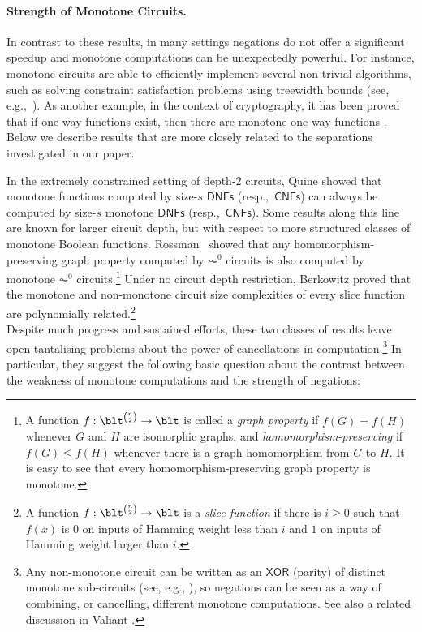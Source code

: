 \documentclass[11pt]{article}
\newcommand{\headsubsec}[1]{\paragraph{#1.}}
\begin{document}
\headsubsec{Strength of Monotone Circuits} 

In contrast to these results, in many settings negations do not offer a significant speedup and monotone computations can be unexpectedly powerful. For instance, monotone circuits are able to efficiently implement several non-trivial algorithms, such as solving constraint satisfaction problems using treewidth bounds (see, e.g.,~\citep[Chapter 3]{Oliveira15}). As another example, in the context of cryptography, it has been proved that if one-way functions exist, then there are monotone one-way functions \citep{DBLP:journals/toc/GoldreichI12}. Below we describe results that are more closely related to the separations investigated in our paper.

 In the extremely constrained setting of depth-$2$ circuits, Quine \cite{quine_1953} showed that monotone functions computed by size-$s$ $\mathsf{DNFs}$ (resp.,~$\mathsf{CNFs}$) can always be computed by size-$s$ monotone $\mathsf{DNFs}$ (resp.,~$\mathsf{CNFs}$). Some results along this line are  known for larger circuit depth, but with respect to more structured classes of monotone Boolean functions. Rossman~\cite{rossman_2008, rossman_16} showed that any homomorphism-preserving graph property computed by \(\AC^0\) circuits is also computed
by monotone \(\AC^0\) circuits.\footnote{A function $f : \blt^{\binom{n}{2}} \to \blt$
is called a \emph{graph property}
if
$f(G) = f(H)$ whenever $G$ and $H$ are isomorphic graphs,
and \emph{homomorphism-preserving}
if
$f(G) \leq f(H)$ whenever there is a 
graph homomorphism from $G$ to $H$. It is easy to see that every homomorphism-preserving graph property is monotone.} Under no circuit depth restriction, 
Berkowitz \citep{berkowitz} proved that the monotone and non-monotone circuit size complexities of every slice function are polynomially related.\footnote{A function $f : \blt^{\binom{n}{2}} \to \blt$
is a \emph{slice function} if there is $i \geq 0$ such that $f(x)$ is $0$ on inputs of Hamming weight less than $i$ and $1$ on inputs of Hamming weight larger than $i$.}\\













Despite much progress and sustained efforts, these two classes of results
 leave open tantalising problems about the power of cancellations in computation.\footnote{Any non-monotone circuit can be written as an $\mathsf{XOR}$ (parity) of distinct monotone sub-circuits (see, e.g., \citep[Appendix A.1]{DBLP:conf/tcc/GuoMOR15}), so negations can be seen as a way of combining, or cancelling, different monotone computations. See also a  related discussion in Valiant \citep{DBLP:journals/tcs/Valiant80}.} In particular, they suggest the following basic question about the contrast between the weakness of monotone computations and the strength of negations:
\end{document}
